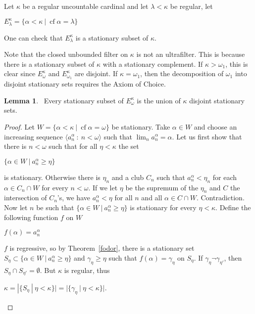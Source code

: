 \documentclass[8pt]{article}
\theoremstyle{definition}
\theoremstyle{definition}
\theoremstyle{definition}
\theoremstyle{definition}
\theoremstyle{definition}
\theoremstyle{definition}
\theoremstyle{definition}
\theoremstyle{definition}
\newtheorem{lemma}{Lemma}[section]
\theoremstyle{definition}
\theoremstyle{definition}
\theoremstyle{definition}
\theoremstyle{definition}
\theoremstyle{definition}
\theoremstyle{definition}
\theoremstyle{question}
\begin{document}
Let $\kappa$ be a regular uncountable cardinal and let $\lambda < \kappa$ be regular, let
\begin{center}
  $E^{\kappa}_{\lambda} = \{ \alpha < \kappa \: | \: \operatorname{cf} \alpha = \lambda \}$
\end{center}
One can check that $E^{\kappa}_{\lambda}$ is a stationary subset of $\kappa$.

Note that the closed unbounded filter on $\kappa$ is not an ultrafilter. 
This is because there is a stationary subset of $\kappa$ with a stationary complement. If $\kappa > \omega_1$,
this is clear since $E_{\omega}^{\kappa}$ and $E_{\omega_1}^{\kappa}$ are disjoint. If $\kappa = \omega_1$, then
the decomposition of $\omega_1$ into disjoint stationary sets requires the Axiom of Choice.

\begin{lemma}~\label{stationary:lemma}
  Every stationary subset of $E_{\omega}^{\kappa}$ is the union of $\kappa$ disjoint stationary sets.
\end{lemma}

\begin{proof}
  Let $W = \{ \alpha < \kappa \: | \: \operatorname{cf} \alpha = \omega \}$ be stationary. Take $\alpha \in W$ and
  choose an increasing sequence $\langle a^{\alpha}_n \: : \: n < \omega \rangle$ such that 
  $\lim_n a^{\alpha}_n = \alpha$. Let us first show that there is $n < \omega$ such that for all $\eta < \kappa$ the set
  \begin{center}
    $\{ \alpha \in W \: | \: a^{\alpha}_n \geq \eta \}$
  \end{center}
  is stationary. Otherwise there is $\eta_n$ and a club $C_n$ such that $a^{\alpha}_n < \eta_n$
  for each $\alpha \in C_n \cap W$ for every $n < \omega$. 
  If we let $\eta$ be the supremum of the $\eta_n$ and $C$ the intersection of $C_n$'s,
  we have $a_n^{\alpha} < \eta$ for all $n$ and all $\alpha \in C \cap W$. Contradiction.
  Now let $n$ be such that $\{ \alpha \in W \: | \: a^{\alpha}_n \geq \eta \}$ is stationary 
  for every $\eta < \kappa$. Define the following function $f$ on $W$
  \begin{center}
    $f(\alpha) = a^{\alpha}_n$
  \end{center}
  $f$ is regressive, so by Theorem~\ref{fodor}, there is a stationary set $S_{\eta} \subset \{ \alpha \in W \: | \: a^{\alpha}_n \geq \eta \}$
  and $\gamma_{\eta} \geq \eta$ such that $f(\alpha) = \gamma_{\eta}$ on $S_{\eta}$.
  If $\gamma_{\eta} \neg \gamma_{\eta'}$, then $S_{\eta} \cap S_{\eta'} = \emptyset$. But $\kappa$ is regular, thus
  \begin{center}
    $\kappa = |\{ S_{\eta} \: | \: \eta < \kappa\}| = |\{ \gamma_{\eta} \: | \: \eta < \kappa \}|$.
  \end{center}
\end{proof}
\end{document}
